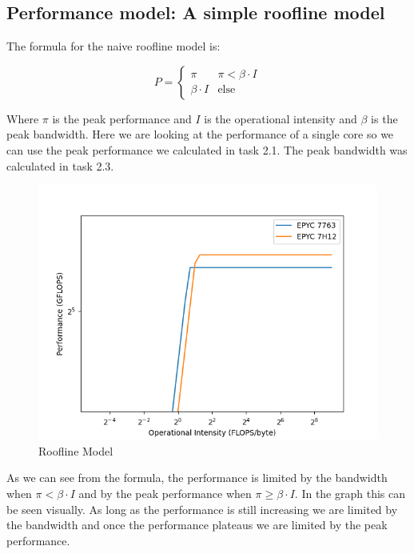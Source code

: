 \documentclass[unicode,11pt,a4paper,oneside,numbers=endperiod,openany]{scrartcl}
\begin{document}
\subsection{Performance model: A simple roofline model}

The formula for the naive roofline model is:

$$
P = \begin{cases}
    \pi & \pi < \beta \cdot I \\
    \beta \cdot I & \text{else}
\end{cases}
$$

Where $\pi$ is the peak performance and $I$ is the operational intensity and $\beta$ is the peak bandwidth.
Here we are looking at the performance of a single core so we can use the peak performance we calculated in task 2.1.
The peak bandwidth was calculated in task 2.3. 

\begin{figure}[ht]
\centering
\includegraphics[width=\textwidth]{../code/roofline/roofline_plot.png}
\caption{Roofline Model}
\label{fig:roofline}
\end{figure}

As we can see from the formula, the performance is limited by the bandwidth when $\pi < \beta \cdot I$ and by the peak performance when $\pi \geq \beta \cdot I$.
In the graph this can be seen visually. As long as the performance is still increasing we are limited by the bandwidth and once the performance plateaus we are limited by the peak performance.
\end{document}

